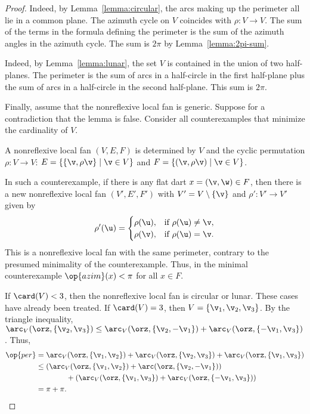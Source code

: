 \begin{proof} 
  Indeed, by Lemma~\ref{lemma:circular},
the arcs making up the perimeter all lie in a common plane.  The
azimuth cycle on $V$ coincides with $\rho:V\to V$.  The sum of the
terms in the formula defining the perimeter is the sum of the
azimuth angles in the azimuth cycle.  The sum is $2\pi$ by
Lemma~\ref{lemma:2pi-sum}.


  Indeed, by Lemma~\ref{lemma:lunar}, the
set $V$ is contained in the union of two half-planes.  The perimeter
is the sum of arcs in a half-circle in the first half-plane plus the
sum of arcs in a half-circle in the second half-plane. This sum is
$2\pi$.

Finally, assume that the nonreflexive local fan is generic.  Suppose for a
contradiction that the lemma is false.  Consider all counterexamples
that minimize the cardinality of $V$.  

A nonreflexive local fan $(V,E,F)$ is determined by $V$ and the cyclic
permutation $\rho:V\to V$: $E=\{\{\v,\rho \v\}\mid \v\in V\}$ and $F
= \{(\v,\rho \v)\mid \v\in V\}$.

In such a counterexample, if there is any flat dart $x=(\v,\w)\in F$,
then there is a new nonreflexive local fan $(V',E',F')$ with $V' =
V\setminus\{\v\}$ and $\rho':V'\to V'$ given by
\[ 
\rho'(\u) = \begin{cases}
\rho(\u), & \text{if } \rho(\u)\ne \v,\\
\rho(\v), & \text{if }\rho(\u) = \v.\\
\end{cases}
\] 
This is a nonreflexive local fan with the same perimeter, contrary to the presumed
minimality of the counterexample.  Thus, in the minimal counterexample
$\op{azim}(x) <\pi$ for all $x\in F$.

If $\card(V) <3$, then the nonreflexive local fan is circular or lunar.  These
cases have 
already been treated.  If $\card(V)=3$, then $V=\{\v_1,\v_2,\v_3\}$.
By the triangle inequality, $\arc_V(\orz,\{\v_2,\v_3\}) \le
\arc_V(\orz,\{\v_2,-\v_1\})+\arc_V(\orz,\{-\v_1,\v_3\})$.  Thus,
\begin{align*}
  \op{per} &=\arc_V(\orz,\{\v_1,\v_2\}) 
  + \arc_V(\orz,\{\v_2,\v_3\}) 
  + \arc_V(\orz,\{\v_1,\v_3\})\\
  &\le(\arc_V(\orz,\{\v_1,\v_2\})+\arc(\orz,\{\v_2,-\v_1\}))
  \\&\qquad\qquad+(\arc_V(\orz,\{\v_1,\v_3\})
+\arc_V(\orz,\{-\v_1,\v_3\})) \\
  &= \pi+\pi.
\end{align*}


\end{proof}
